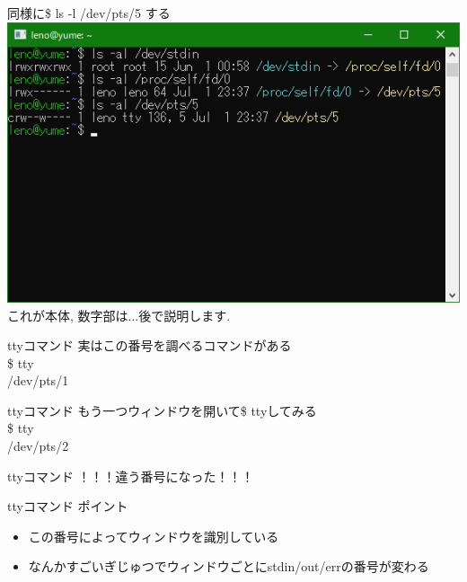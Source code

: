 \documentclass[uplatex, dvipdfmx, unicode]{beamer}
\begin{document}
\begin{frame}
  同様に\$ ls -l /dev/pts/5 する \\
  \vspace{0.2in}
  {
    \centering
    \includegraphics[keepaspectratio, scale=.5]{./img/self.png} \\
  }
  これが本体, 数字部は...後で説明します.
\end{frame}

\begin{frame}{ttyコマンド}
  実はこの番号を調べるコマンドがある \\
  \vspace{0.2in}
  \$ tty \\
  /dev/pts/1
\end{frame}

\begin{frame}{ttyコマンド}
  もう一つウィンドウを開いて\$ ttyしてみる\\
  \vspace{0.2in}
  \$ tty \\
  /dev/pts/2
\end{frame}

\begin{frame}{ttyコマンド}
  \centering
  \alert{\Huge{！！！違う番号になった！！！}}
\end{frame}

\begin{frame}{ttyコマンド}
  ポイント
  \begin{itemize}
    \item{この番号によってウィンドウを識別している}
    \item{なんかすごいぎじゅつでウィンドウごとにstdin/out/errの番号が変わる}
  \end{itemize}
\end{frame}
\end{document}
